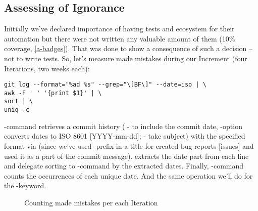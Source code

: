 \subsection{Assessing of Ignorance} \label{ut-fail}

Initially we've declared importance of having tests and ecosystem for their automation but there were not written any 
valuable amount of them (10\% coverage, \ref{a-badges}). That was done to show a consequence of such a decision -- not 
to write tests. So, let's measure made mistakes during our Increment (four Iterations, two weeks each):

\begin{lstlisting}[language=terminal]
git log --format="%ad %s" --grep="\[BF\]" --date=iso | \
awk -F ' ' '{print $1}' | \
sort | \
uniq -c
\end{lstlisting}

\noindent {}-command retrieves a commit history ( - to include the commit date, -option 
converts dates to ISO 8601 [YYYY-mm-dd];  - take subject) with the specified format via  (since we've 
used \q{[BF]}-prefix in a title for created bug-reports [issues] and used it as a part of the commit message). \q{awk} 
extracts the date part from each line and delegate sorting to \q{sort}-command by the extracted dates. Finally, 
\q{uniq -c}-command counts the occurrences of each unique date. And the same operation we'll do for the \q{fix}-keyword.

\begin{figure}[h]
  \begin{center}
  \end{center}
  \caption{Counting made mistakes per each Iteration}\label{im-errors}
\end{figure}


